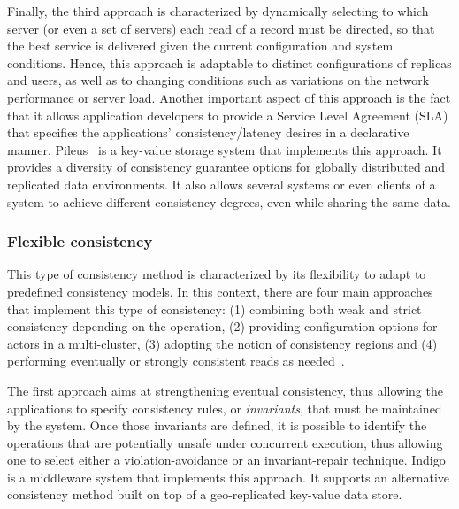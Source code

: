 Finally, the third approach is characterized by dynamically selecting to which server (or even a set of servers) each read of a record must be directed, so that the best service is delivered given the current configuration and system conditions. Hence, this approach is adaptable to distinct configurations of replicas and users, as well as to changing conditions such as variations on the network performance or server load. Another important aspect of this approach is the fact that it allows application developers to provide a Service Level Agreement (SLA) that specifies the applications' consistency/latency desires in a declarative~ manner.  Pileus~\cite{Terry:2013} is a key-value storage system that implements this approach. It provides a diversity of consistency guarantee options for globally distributed and replicated data environments. It also allows several systems or even clients of a system to achieve different consistency degrees, even while sharing the same data.

\subsubsection{Flexible consistency}

This type of consistency method is characterized by its flexibility to adapt to predefined consistency models. In this context, there are four main approaches that implement this type of consistency: (1) combining both weak and strict consistency depending on the operation, {\rc (2) providing configuration options for actors in a multi-cluster}, (3) adopting the notion of consistency regions and (4) performing eventually or strongly consistent reads as needed~\cite{balegas2015putting, BernsteinBBCFKK17, Chen:2014, sivasubramanian2012amazon}.

The first approach aims at strengthening eventual consistency, thus allowing the applications to specify consistency rules, or \textit{invariants}, that must be maintained by the system. Once those invariants are defined, it is possible to identify the operations that are potentially unsafe under concurrent execution, thus allowing one to select either a violation-avoid\-ance or an invariant-repair technique. Indigo~\cite{balegas2015putting} is a middleware system that implements this approach. It supports an alternative consistency method built on top of a geo-replicated key-value data store. 

